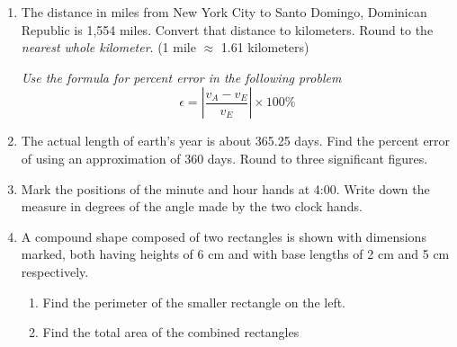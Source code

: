 \begin{enumerate}
\item The distance in miles from New York City to Santo Domingo, Dominican Republic is 1,554 miles. Convert that distance to kilometers. Round to the \emph{nearest whole kilometer}. (1 mile $\approx$ 1.61 kilometers) \vspace{2cm}

\emph{Use the formula for percent error in the following problem}
$$\epsilon = \left|\frac{v_A-v_E}{v_E}\right| \times 100\%$$

\item The actual length of earth's year is about 365.25 days. Find the percent error of using an approximation of 360 days. Round to three significant figures.

\item Mark the positions of the minute and hour hands at 4:00. Write down the measure in degrees of the angle made by the two clock hands. \par \vspace{0.25cm}

\item A compound shape composed of two rectangles is shown with dimensions marked, both having heights of 6 cm and with base lengths of 2 cm and 5 cm respectively.
  \begin{multicols}{2}
    \begin{enumerate}
      \item Find the perimeter of the smaller rectangle on the left. \vspace{2cm}
      \item Find the total area of the combined rectangles
      \end{enumerate}
    \end{multicols} \vspace{1cm}

\end{enumerate}
